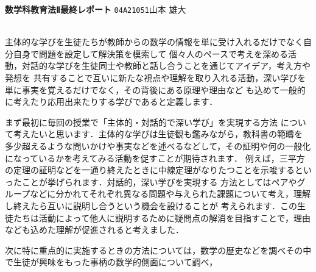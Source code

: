 \documentclass{ltjsarticle}
\begin{document}
{\textbf{\LARGE{数学科教育法Ⅱ最終レポート}}}\hspace{\fill} {\texttt{\Large{04A21051}}}{\Large{山本 雄大}}\\\\
\par 
主体的な学びを生徒たちが教師からの数学の情報を単に受け入れるだけでなく自分自身で問題を設定して解決策を模索して
個々人のペースで考えを深める活動，対話的な学びを生徒同士や教師と話し合うことを通じてアイデア，考え方や発想を
共有することで互いに新たな視点や理解を取り入れる活動，深い学びを単に事実を覚えるだけでなく，その背後にある原理や理由など
も込めて一般的に考えたり応用出来たりする学びであると定義します．\par
まず最初に毎回の授業で「主体的・対話的で深い学び」を実現する方法
について考えたいと思います．主体的な学びは生徒観も鑑みながら，教科書の範疇を
多少超えるような問いかけや事実などを述べるなどして，その証明や何の一般化になっているかを考えてみる活動を促すことが期待されます．
例えば，三平方の定理の証明などを一通り終えたときに中線定理がなりたつことを示唆するといったことが挙げられます．対話的，深い学びを実現する
方法としてはペアやグループなどに分かれてそれぞれ異なる問題や与えられた課題について考え，理解し終えたら互いに説明し合うという機会を設けることが
考えられます．この生徒たちは活動によって他人に説明するために疑問点の解消を目指すことで，理由なども込めた理解が促進されると考えました．\par
次に特に重点的に実施するときの方法については，数学の歴史などを調べその中で生徒が興味をもった事柄の数学的側面について調べ，
\end{document}
